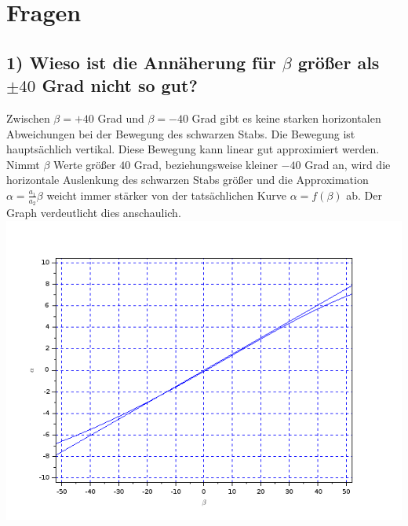 \section{Fragen}
\subsection*{1) Wieso ist die Annäherung für $\beta$ größer als $\pm40$ Grad nicht so gut?}
Zwischen $\beta=+40$ Grad und $\beta=-40$ Grad gibt es keine starken horizontalen Abweichungen bei der Bewegung des schwarzen Stabs. Die Bewegung ist hauptsächlich vertikal. Diese Bewegung kann linear gut approximiert werden. Nimmt $\beta$ Werte größer $40$ Grad, beziehungsweise kleiner $-40$ Grad an, wird die horizontale Auslenkung des schwarzen Stabs größer und die Approximation $\alpha=\frac{a_1}{a_2}\beta$ weicht immer stärker von der tatsächlichen Kurve $\alpha = f(\beta)$ ab. Der Graph verdeutlicht dies anschaulich.\\
\includegraphics[scale=0.5]{images/plot1.png}

